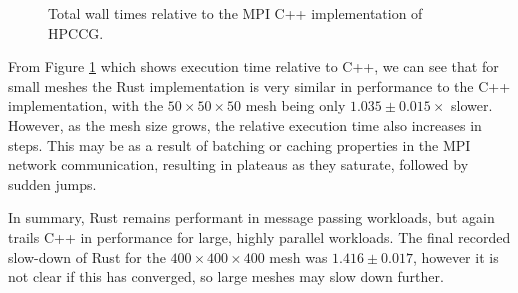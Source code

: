 \begin{figure}[H]
    \centering
    
    \vspace*{-0.5cm}
    \caption{Total wall times relative to the MPI C++ implementation of HPCCG.}
    \label{fig:10_mpi_line_relative}
\end{figure}

From Figure \ref{fig:10_mpi_line_relative} which shows execution time relative to C++, we can see that for small meshes the Rust implementation is very similar in performance to the C++ implementation, with the $50 \times 50 \times 50$ mesh being only $1.035 \pm 0.015 \times$ slower. However, as the mesh size grows, the relative execution time also increases in steps. This may be as a result of batching or caching properties in the MPI network communication, resulting in plateaus as they saturate, followed by sudden jumps. 

In summary, Rust remains performant in message passing workloads, but again trails C++ in performance for large, highly parallel workloads. The final recorded slow-down of Rust for the $400 \times 400 \times 400$ mesh was $1.416 \pm 0.017$, however it is not clear if this has converged, so large meshes may slow down further.




